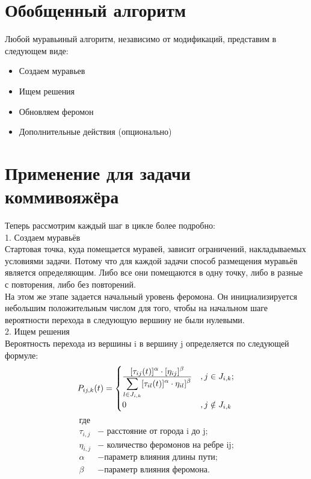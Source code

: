 \documentclass[12pt]{report}
\begin{document}
\section{Обобщенный алгоритм}
Любой муравьиный алгоритм, независимо от модификаций, представим в следующем виде:
\begin{itemize}
	\item Создаем муравьев 
	\item Ищем решения 
	\item Обновляем феромон
	\item Дополнительные действия (опционально) 
\end{itemize}




\section{Применение для задачи коммивояжёра}
Теперь рассмотрим каждый шаг в цикле более подробно:\\

1. Создаем муравьёв\\
   Стартовая точка, куда помещается муравей, зависит ограничений,   накладываемых условиями задачи. Потому что для каждой задачи   способ размещения муравьёв является определяющим. Либо все    они помещаются в одну точку, либо в разные с повторения, либо    без повторений. \\
  На этом же этапе задается начальный уровень феромона. Он    инициализируется небольшим положительным числом для того,    чтобы на начальном шаге вероятности перехода в следующую    вершину не были нулевыми. \\
  
2. Ищем решения  \\
 Вероятность перехода из вершины i в вершину j определяется по следующей формуле:\\   
\begin{equation}
P_{i j, k} (t)= \begin{cases}
\displaystyle[\tau_{ij}(t)]^\alpha \cdot [\eta_{ij}]^\beta\over 
\displaystyle\sum\limits_{l \in J_{i, k }} [\tau_{il}(t)]^\alpha \cdot \eta_{il}]^\beta  &,  j \in J_{i, k};\\
0 &,  j \notin J_{i, k}
\end{cases}
\end{equation}
 \begin{align*}
    \text{где} \\
   \tau _{i,j} &- \text{ расстояние от города i до j;} \\
    \eta _{i,j} &- \text{ количество феромонов на ребре ij;} \\
    \alpha &- \text{параметр влияния длины пути;} \\
    \beta &- \text{параметр влияния феромона.}
\end{align*}
\end{document}
